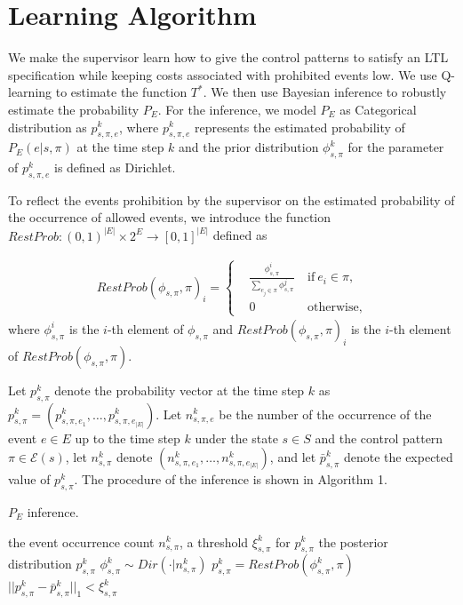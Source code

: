 \documentclass[a4j,12pt,oneside,openany,english,dvipdfmx]{jsbook}
\begin{document}
\section{Learning Algorithm}
We make the supervisor learn how to give the control patterns to satisfy an LTL specification while keeping costs associated with prohibited events low. We use Q-learning to estimate the function $T^{\ast}$. We then use Bayesian inference to robustly estimate the probability $P_E$. For the inference, we model $P_E$ as Categorical distribution as $p^k_{s,\pi,e}$, where $p^k_{s,\pi,e}$ represents the estimated probability of $P_E(e|s,\pi)$ at the time step $k$ and the prior distribution $\phi^k_{s,\pi}$ for the parameter of $p^k_{s,\pi,e}$ is defined as Dirichlet.

To reflect the events prohibition by the supervisor on the estimated probability of the occurrence of allowed events, we introduce the function $RestProb : (0,1)^{|E|} \times 2^E \rightarrow [0,1]^{|E|}$ defined as

\begin{align}
  RestProb(\phi_{s,\pi},\pi)_i =
  \left\{
  \begin{aligned}
    & \frac{\phi^i_{s,\pi}}{\sum_{e_j \in \pi} \phi^j_{s,\pi}} \  &\text{if}\ e_i \in \pi,\\
    &0   \ &\text{otherwise},
  \end{aligned}
  \right.
\end{align}
where $\phi^i_{s,\pi}$ is the $i$-th element of $\phi_{s,\pi}$ and $RestProb(\phi_{s,\pi},\pi)_i$ is the $i$-th element of $RestProb(\phi_{s,\pi},\pi)$.

Let $p^k_{s,\pi}$ denote the probability vector at the time step $k$ as $p^k_{s,\pi} = (p^k_{s,\pi,e_1}, \ldots, p^k_{s,\pi,e_{|E|}})$. Let $n^k_{s,\pi,e}$ be the number of the occurrence of the event $e \in E$ up to the time step $k$ under the state $s \in S$ and the control pattern $\pi \in \mathcal{E}(s)$, let $n^k_{s,\pi}$ denote $(n^k_{s,\pi,e_1}, \ldots, n^k_{s,\pi,e_{|E|}})$, and let $\bar{p}^k_{s,\pi}$ denote the expected value of $p^k_{s,\pi}$. The procedure of the inference is shown in Algorithm 1.

\begin{algorithm}
 \caption{$P_E$ inference.}
 \begin{algorithmic}[1]
 \renewcommand{\algorithmicrequire}{\textbf{Input:}}
 \renewcommand{\algorithmicensure}{\textbf{Output:}}
 \REQUIRE the event occurrence count $n^k_{s,\pi}$, a threshold $\xi^k_{s,\pi}$ for $p^k_{s,\pi}$
 \ENSURE  the posterior distribution $p^k_{s,\pi}$
  \REPEAT
  \STATE $\phi^k_{s,\pi} \sim Dir(\cdot|n^k_{s,\pi})$
  \STATE $p^k_{s,\pi} = RestProb(\phi^k_{s,\pi},\pi)$
  \UNTIL $||p^k_{s,\pi} - \bar{p}^k_{s,\pi}||_1 < \xi^k_{s,\pi}$
 \end{algorithmic}
 \label{bayes}
 \end{algorithm}
\end{document}
